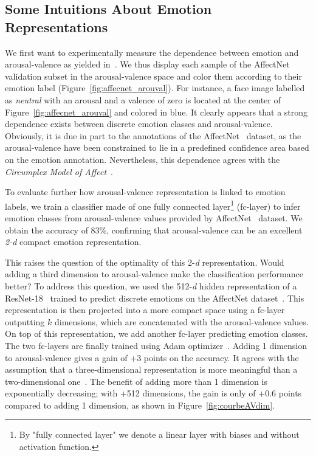 \documentclass{bmvc2k}
\begin{document}
\subsection{Some Intuitions About Emotion Representations}
\label{subsec:preliminary_study}

We first want to experimentally measure the dependence between emotion and arousal-valence as yielded in~\cite{russell_circumplex_1980}. We thus display each sample of the AffectNet~\cite{mollahosseini_affectnet:_2017} validation subset in the arousal-valence space and color them according to their emotion label (Figure~\ref{fig:affecnet_arouval}). For instance, a face image labelled as \textit{neutral} with an arousal and a valence of zero is located at the center of Figure~\ref{fig:affecnet_arouval} and colored in blue. It clearly appears that a strong dependence exists between discrete emotion classes and arousal-valence. Obviously, it is due in part to the annotations of the AffectNet~\cite{mollahosseini_affectnet:_2017} dataset, as the arousal-valence have been constrained to lie in a predefined confidence area based on the emotion annotation. Nevertheless, this dependence agrees with the \textit{Circumplex Model of Affect}~\cite{russell_circumplex_1980}.

To evaluate further how arousal-valence representation is linked to emotion labels, we train a classifier made of one  fully connected layer\footnote{By "fully connected layer" we denote a linear layer with biases and without activation function.} (fc-layer) to infer emotion classes from arousal-valence values provided by AffectNet~\cite{mollahosseini_affectnet:_2017} dataset. We obtain the accuracy of 83\%, confirming that arousal-valence can be an excellent \textit{2-d} compact emotion representation.  

This raises the question of the optimality of this 2-\textit{d} representation. Would adding a third dimension to arousal-valence make the classification performance better? To address this question, we used the 512-\textit{d} hidden representation of a ResNet-18~\cite{he_deep_2015} trained to predict  discrete emotions on the AffectNet dataset~\cite{mollahosseini_affectnet:_2017}. This representation is then projected into a more compact space using a fc-layer outputting $k$ dimensions, which are concatenated with the arousal-valence values. On top of this representation, we add another fc-layer predicting emotion classes. The two fc-layers are finally trained using Adam optimizer~\cite{kingma2014adam}.
Adding 1 dimension to arousal-valence gives a gain of +3 points on the accuracy. It agrees with the assumption that a three-dimensional representation is more meaningful than a two-dimensional one~\cite{mehrabian1996pleasure}. The benefit of adding more than 1 dimension is exponentially decreasing; with +512 dimensions, the gain is only of +0.6 points compared to adding 1 dimension, as shown in Figure~\ref{fig:courbeAVdim}.
\end{document}
